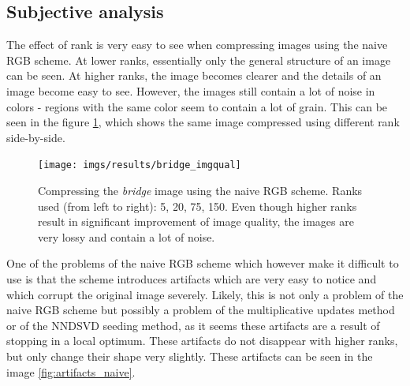 \documentclass[thesis=M,english]{FITthesis}[2012/10/20]
\begin{document}
\subsection{Subjective analysis}
\label{sec:subj_analysis_naive}
The effect of rank is very easy to see when compressing images using the naive RGB
scheme. At lower ranks, essentially only the general structure of an image can be seen.
At higher ranks, the image becomes clearer and the details of an image become easy to
see. However, the images still contain a lot of noise in colors - regions with the same
color seem to contain a lot of grain. This can be seen in the figure \ref{fig:bridge_imgqual},
which shows the same image compressed using different rank side-by-side.

\begin{figure}[h]
  \centering
  \texttt{[image: imgs/results/bridge\_imgqual]}
  \caption[Naive RGB scheme images with different ranks]{Compressing the \emph{bridge} image using the naive RGB scheme.
           Ranks used (from left to right): 5, 20, 75, 150. Even though
           higher ranks result in significant improvement of image
           quality, the images are very lossy and contain a lot of noise.}
  \label{fig:bridge_imgqual}
\end{figure}

One of the problems of the naive RGB scheme which however make it difficult to use
is that the scheme introduces artifacts which are very easy to notice and which
corrupt the original image severely. Likely, this is not only a problem of the
naive RGB scheme but possibly a problem of the multiplicative updates method or
of the NNDSVD seeding method, as it seems these artifacts are a result of stopping
in a local optimum. These artifacts do not disappear with higher ranks, but only
change their shape very slightly. These artifacts can be seen in the image \ref{fig:artifacts_naive}.
\end{document}
